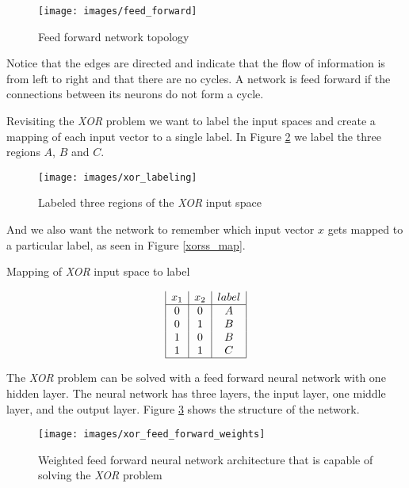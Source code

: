 \begin{figure}[h!]
  \centering
  \texttt{[image: images/feed\_forward]}
  \caption{Feed forward network topology}
  \label{ff}
\end{figure}

Notice that the edges are directed and indicate that the flow of information is from left to right and that there are no cycles.
A network is feed forward if the connections between its neurons do not form a cycle.

Revisiting the {\it XOR} problem we want to label the input spaces
and create a mapping of each input vector to a single label.
In Figure \ref{xor_label} we label the three regions $A$, $B$ and $C$.

\begin{figure}[h!]
  \centering
  \texttt{[image: images/xor\_labeling]}
  \caption{Labeled three regions of the {\it XOR} input space}
  \label{xor_label}
\end{figure}

And we also want the network to remember which input vector $x$ gets mapped to a
particular label, as seen in Figure \ref{xorss_map}.

\begin{table}[h!]
\caption{Mapping of {\it XOR} input space to label}
\label{xorss_map}
\begin{displaymath}
\begin{array}{|c|c|c|}
   x_1
 & x_2
 & label
\\
\hline
0 & 0 & A\\
0 & 1 & B\\
1 & 0 & B\\
1 & 1 & C\\
\hline
\end{array}
\end{displaymath}
\end{table}

The {\it XOR} problem can be solved with a feed forward neural network with
one hidden layer.
The neural network has three layers, the input layer, one middle
layer, and the output layer.
Figure \ref{xffw} shows the structure of the
network.

\begin{figure}[h!]
  \centering
  \texttt{[image: images/xor\_feed\_forward\_weights]}
  \caption{Weighted feed forward neural network architecture that is
    capable of solving the {\it XOR}
    problem}
  \label{xffw}
\end{figure}

